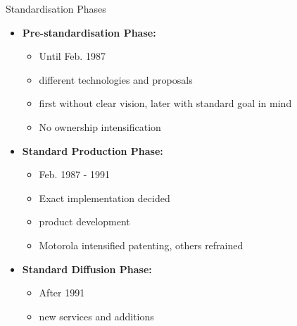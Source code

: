 \begin{frame}{Standardisation Phases}
  \begin{itemize}
    \item \textbf{Pre-standardisation Phase:}
    \begin{itemize}
      \item Until Feb. 1987
      \item different technologies and proposals
      \item first without clear vision, later with standard goal in mind
      \item No ownership intensification
    \end{itemize}
    \item \textbf{Standard Production Phase:}
    \begin{itemize}
      \item Feb. 1987 - 1991
      \item Exact implementation decided
      \item product development
      \item Motorola intensified patenting, others refrained
    \end{itemize}
    \item \textbf{Standard Diffusion Phase:}
    \begin{itemize}
      \item After 1991
      \item new services and additions
    \end{itemize}
  \end{itemize}
\end{frame}

